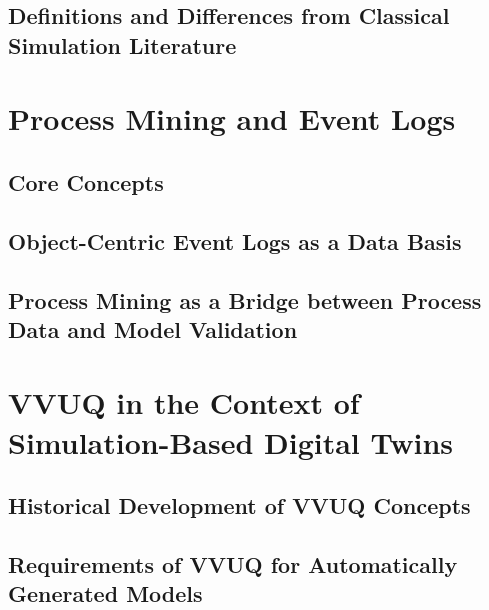 \subsection{Definitions and Differences from Classical Simulation Literature}

\section{Process Mining and Event Logs}
\label{sec:process-mining}

\subsection{Core Concepts}

\subsection{Object-Centric Event Logs as a Data Basis}
\label{sec:object-centric-event-logs}


\subsection{Process Mining as a Bridge between Process Data and Model Validation}



\section{VVUQ in the Context of Simulation-Based Digital Twins}
\label{sec:vvuq-sbdt}


\subsection{Historical Development of VVUQ Concepts}

\subsection{Requirements of VVUQ for Automatically Generated Models}

